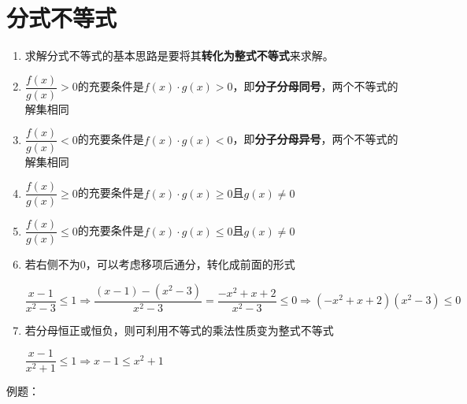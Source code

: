 \section*{分式不等式}
\begin{enumerate}
    \item 求解分式不等式的基本思路是要将其\textbf{转化为整式不等式}来求解。
    \item $\dfrac{f(x)}{g(x)} > 0$的充要条件是$f(x) \cdot g(x) > 0$，即\textbf{分子分母同号}，两个不等式的解集相同
    \item $\dfrac{f(x)}{g(x)} < 0$的充要条件是$f(x) \cdot g(x) < 0$，即\textbf{分子分母异号}，两个不等式的解集相同
    \item $\dfrac{f(x)}{g(x)} \geq 0$的充要条件是$f(x) \cdot g(x) \geq 0$且$g(x) \neq 0$
    \item $\dfrac{f(x)}{g(x)} \leq 0$的充要条件是$f(x) \cdot g(x) \leq 0$且$g(x) \neq 0$
    \item 若右侧不为0，可以考虑移项后通分，转化成前面的形式
    \begin{example}
        $\dfrac{x-1}{x^2-3} \leq 1 \Longrightarrow \dfrac{(x-1) - (x^2-3)}{x^2-3} = \dfrac{-x^2+x+2}{x^2-3} \leq 0 \Longrightarrow (-x^2+x+2)(x^2-3) \leq 0$
    \end{example}
    \item 若分母恒正或恒负，则可利用不等式的乘法性质变为整式不等式
    \begin{example}
        $\dfrac{x-1}{x^2+1} \leq 1 \Longrightarrow x-1 \leq x^2 + 1$
    \end{example}
\end{enumerate}
例题：
